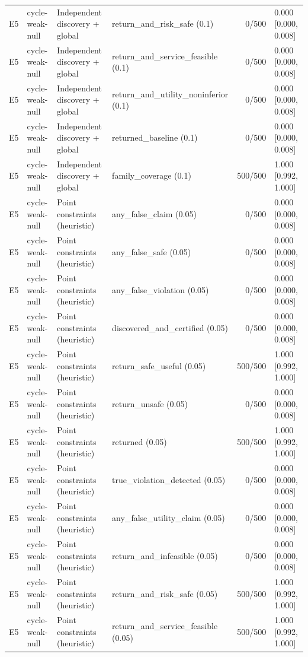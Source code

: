 \begin{longtable}{p{.04\linewidth}p{.18\linewidth}p{.19\linewidth}p{.16\linewidth}r p{.21\linewidth}}
E5 & cycle-weak-null & Independent discovery + global & return\_and\_risk\_safe (0.1) & 0/500 & 0.000 [0.000, 0.008]\\
E5 & cycle-weak-null & Independent discovery + global & return\_and\_service\_feasible (0.1) & 0/500 & 0.000 [0.000, 0.008]\\
E5 & cycle-weak-null & Independent discovery + global & return\_and\_utility\_noninferior (0.1) & 0/500 & 0.000 [0.000, 0.008]\\
E5 & cycle-weak-null & Independent discovery + global & returned\_baseline (0.1) & 0/500 & 0.000 [0.000, 0.008]\\
E5 & cycle-weak-null & Independent discovery + global & family\_coverage (0.1) & 500/500 & 1.000 [0.992, 1.000]\\
E5 & cycle-weak-null & Point constraints (heuristic) & any\_false\_claim (0.05) & 0/500 & 0.000 [0.000, 0.008]\\
E5 & cycle-weak-null & Point constraints (heuristic) & any\_false\_safe (0.05) & 0/500 & 0.000 [0.000, 0.008]\\
E5 & cycle-weak-null & Point constraints (heuristic) & any\_false\_violation (0.05) & 0/500 & 0.000 [0.000, 0.008]\\
E5 & cycle-weak-null & Point constraints (heuristic) & discovered\_and\_certified (0.05) & 0/500 & 0.000 [0.000, 0.008]\\
E5 & cycle-weak-null & Point constraints (heuristic) & return\_safe\_useful (0.05) & 500/500 & 1.000 [0.992, 1.000]\\
E5 & cycle-weak-null & Point constraints (heuristic) & return\_unsafe (0.05) & 0/500 & 0.000 [0.000, 0.008]\\
E5 & cycle-weak-null & Point constraints (heuristic) & returned (0.05) & 500/500 & 1.000 [0.992, 1.000]\\
E5 & cycle-weak-null & Point constraints (heuristic) & true\_violation\_detected (0.05) & 0/500 & 0.000 [0.000, 0.008]\\
E5 & cycle-weak-null & Point constraints (heuristic) & any\_false\_utility\_claim (0.05) & 0/500 & 0.000 [0.000, 0.008]\\
E5 & cycle-weak-null & Point constraints (heuristic) & return\_and\_infeasible (0.05) & 0/500 & 0.000 [0.000, 0.008]\\
E5 & cycle-weak-null & Point constraints (heuristic) & return\_and\_risk\_safe (0.05) & 500/500 & 1.000 [0.992, 1.000]\\
E5 & cycle-weak-null & Point constraints (heuristic) & return\_and\_service\_feasible (0.05) & 500/500 & 1.000 [0.992, 1.000]\\

\end{longtable}
